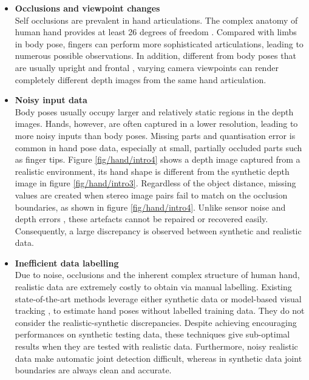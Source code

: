 \begin{itemize} 

\item{\textbf{Occlusions and viewpoint changes}} \\  
Self occlusions are prevalent in hand articulations. The complex anatomy of human hand provides at least 26 degrees of freedom \cite{Rehg1995, Holden1995}. Compared with limbs in body pose, fingers can perform more sophisticated articulations, leading to numerous possible observations. In addition, different from body poses that are usually upright and frontal \cite{Eichner2012}, varying camera viewpoints can render completely different depth images from the same hand articulation. 

\item{\textbf{Noisy input data}} \\ 
Body poses usually occupy larger and relatively static regions in the depth images. 
Hands, however, are often captured in a lower resolution, leading to more noisy inputs than body poses. 
Missing parts and quantisation error is common in hand pose data, especially at small, partially occluded parts such as finger tips. Figure \ref{fig/hand/intro4} shows a depth image captured from a realistic environment, its hand shape is different from the synthetic depth image in figure \ref{fig/hand/intro3}.   
Regardless of the object distance, missing values are created when stereo image pairs fail to match on the occlusion boundaries, as shown in figure \ref{fig/hand/intro4}. 
Unlike sensor noise and depth errors \cite{Girshick2011, Baak2011}, these artefacts cannot be repaired or recovered easily. Consequently, a large discrepancy is observed between synthetic and realistic data.  

\item{\textbf{Inefficient data labelling}} \\ 
Due to noise, occlusions and the inherent complex structure of human hand, realistic data are extremely costly to obtain via manual labelling. 
Existing state-of-the-art methods leverage either synthetic data \cite{Keskin2012} or model-based visual tracking \cite{LaGorce2011, Oikonomidis2012}, to estimate hand poses without labelled training data. 
They do not consider the realistic-synthetic discrepancies. 
Despite achieving encouraging performances on synthetic testing data, these techniques give sub-optimal results when they are tested with realistic data. 
Furthermore, noisy realistic data make automatic joint detection difficult, whereas in synthetic data joint boundaries are always clean and accurate.
\end{itemize} 

